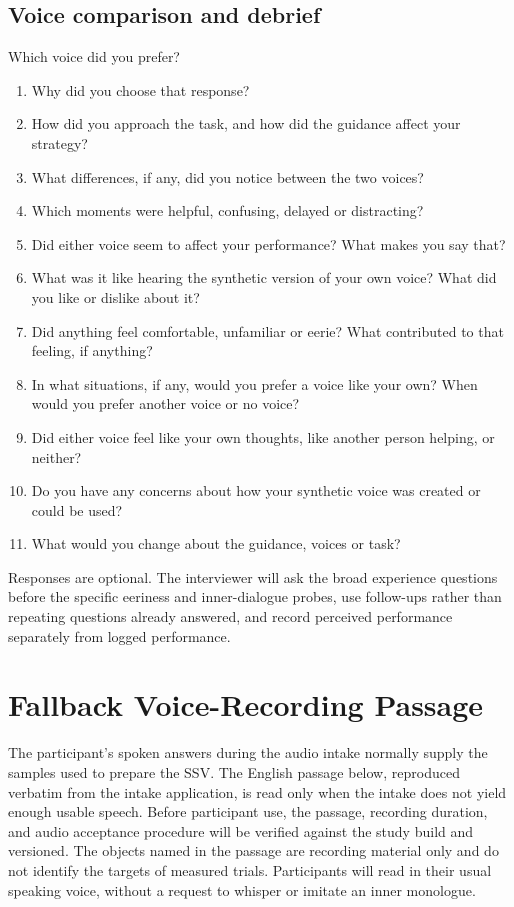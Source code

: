 \subsection{Voice comparison and debrief}
\par\medskip\noindent
Which voice did you prefer?
\par\nopagebreak {}
\begin{enumerate}
\item Why did you choose that response?
\item How did you approach the task, and how did the guidance affect your strategy?
\item What differences, if any, did you notice between the two voices?
\item Which moments were helpful, confusing, delayed or distracting?
\item Did either voice seem to affect your performance? What makes you say that?
\item What was it like hearing the synthetic version of your own voice? What did you like or dislike about it?
\item Did anything feel comfortable, unfamiliar or eerie? What contributed to that feeling, if anything?
\item In what situations, if any, would you prefer a voice like your own? When would you prefer another voice or no voice?
\item Did either voice feel like your own thoughts, like another person helping, or neither?
\item Do you have any concerns about how your synthetic voice was created or could be used?
\item What would you change about the guidance, voices or task?
\end{enumerate}
Responses are optional. The interviewer will ask the broad experience questions before the specific eeriness and inner-dialogue probes, use follow-ups rather than repeating questions already answered, and record perceived performance separately from logged performance.



\section{Fallback Voice-Recording Passage}
The participant's spoken answers during the audio intake normally supply the samples used to prepare the SSV. The English passage below, reproduced verbatim from the intake application, is read only when the intake does not yield enough usable speech. Before participant use, the passage, recording duration, and audio acceptance procedure will be verified against the study build and versioned. The objects named in the passage are recording material only and do not identify the targets of measured trials. Participants will read in their usual speaking voice, without a request to whisper or imitate an inner monologue.

